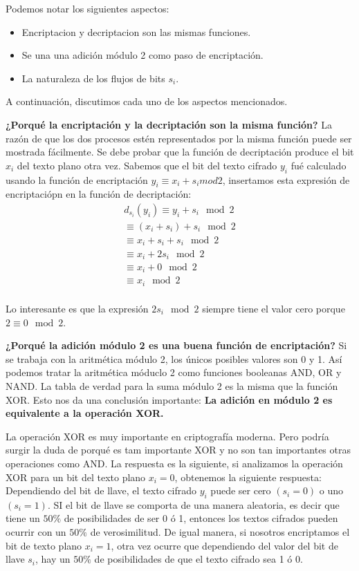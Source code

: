 \documentclass{llncs}
\theoremstyle{plane}
\begin{document}
Podemos notar los siguientes aspectos:
\begin{itemize}
\item Encriptacion y decriptacion son las mismas funciones.
\item Se una una adición módulo 2 como paso de encriptación.
\item La naturaleza de los flujos de bits $s_{i}$.
\end{itemize}
A continuación, discutimos cada uno de los aspectos mencionados.

\textbf{¿Porqué la encriptación y la decriptación son la misma función?}
La razón de que los dos procesos estén representados por la misma función puede ser mostrada fácilmente. Se debe probar que la función de decriptación produce el bit $x_{i}$ del texto plano otra vez. Sabemos que el bit del texto cifrado $y_{i}$ fué calculado usando la función de encriptación $y_{i} \equiv x_{i} + s_{i} mod 2 $, insertamos esta expresión de encriptaciópn en la función de decriptación:
\begin{equation*}
\begin{aligned}
d_{s_{i}}(y_{i}) \equiv y_{i}+s_{i}\mod{2} \\
\equiv (x_{i}+s_{i})+s_{i}\mod{2} \\
\equiv x_{i}+s_{i}+s_{i}\mod{2} \\
\equiv x_{i}+2s_{i}\mod{2} \\
\equiv x_{i}+0\mod{2} \\
\equiv x_{i}\mod{2} \\
\end{aligned}
\end{equation*}

Lo interesante es que la expresión $2s_{i} \mod{2}$ siempre tiene el valor cero porque $2 \equiv 0 \mod{2}$. 

\textbf{¿Porqué la adición módulo 2 es una buena función de encriptación?}
Si se trabaja con la aritmética módulo 2, los únicos posibles valores son 0 y 1. Así podemos tratar la aritmética móduclo 2 como funciones booleanas AND, OR y NAND. La tabla de verdad para la suma módulo 2 es la misma que la función XOR. Esto nos da una conclusión importante: \textbf{La adición en módulo 2 es equivalente a la operación XOR.}

La operación XOR es muy importante en criptografía moderna. Pero podría surgir la duda de porqué es tam importante XOR y no son tan importantes otras operaciones como AND. La respuesta es la siguiente, si analizamos la operación XOR para un bit del texto plano $x_{i}=0$, obtenemos la siguiente respuesta: Dependiendo del bit de llave, el texto cifrado $y_{i}$ puede ser cero $(s_{i}=0)$ o uno $(s_{i}=1)$. SI el bit de llave se comporta de una manera aleatoria, es decir que tiene un $50\%$  de posibilidades de ser 0 ó 1, entonces los textos cifrados pueden ocurrir con un $50\%$ de verosimilitud. De igual manera, si nosotros encriptamos el bit de texto plano $x_{i}=1$, otra vez ocurre que dependiendo del valor del bit de llave $s_{i}$, hay un $50\%$ de posibilidades de que el texto cifrado sea 1 ó 0.
\end{document}
